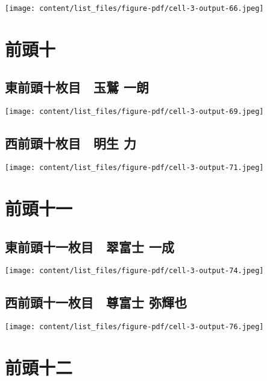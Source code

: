 \documentclass[
  letterpaper,
]{bxjsbook}
\begin{document}
\texttt{[image: content/list\_files/figure-pdf/cell-3-output-66.jpeg]}

\section{前頭十}\label{ux524dux982dux5341}

\subsection{東前頭十枚目　玉鷲
一朗}\label{ux6771ux524dux982dux5341ux679aux76ee-ux7389ux9df2-ux4e00ux6717}

\texttt{[image: content/list\_files/figure-pdf/cell-3-output-69.jpeg]}

\subsection{西前頭十枚目　明生
力}\label{ux897fux524dux982dux5341ux679aux76ee-ux660eux751f-ux529b}

\texttt{[image: content/list\_files/figure-pdf/cell-3-output-71.jpeg]}

\section{前頭十一}\label{ux524dux982dux5341ux4e00}

\subsection{東前頭十一枚目　翠富士
一成}\label{ux6771ux524dux982dux5341ux4e00ux679aux76ee-ux7fe0ux5bccux58eb-ux4e00ux6210}

\texttt{[image: content/list\_files/figure-pdf/cell-3-output-74.jpeg]}

\subsection{西前頭十一枚目　尊富士
弥輝也}\label{ux897fux524dux982dux5341ux4e00ux679aux76ee-ux5c0aux5bccux58eb-ux5f25ux8f1dux4e5f}

\texttt{[image: content/list\_files/figure-pdf/cell-3-output-76.jpeg]}

\section{前頭十二}\label{ux524dux982dux5341ux4e8c}
\end{document}
